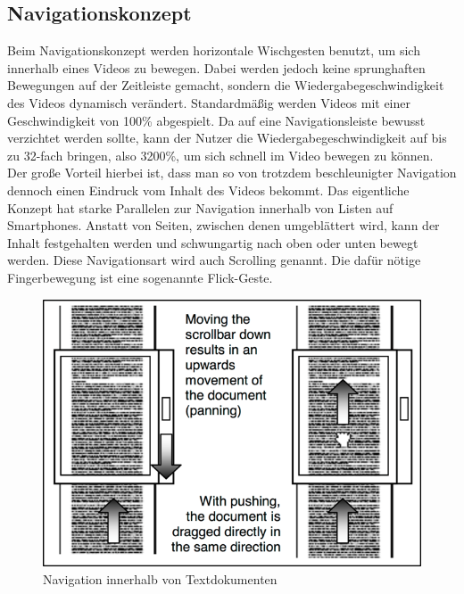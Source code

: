 \documentclass[11pt,a4paper]{report}
\begin{document}
\subsection{Navigationskonzept}

Beim Navigationskonzept werden horizontale Wischgesten benutzt, um sich innerhalb eines Videos zu bewegen. Dabei werden jedoch keine sprunghaften Bewegungen auf der Zeitleiste gemacht, sondern die Wiedergabegeschwindigkeit des Videos dynamisch verändert. Standardmäßig werden Videos mit einer Geschwindigkeit von 100\% abgespielt. Da auf eine Navigationsleiste bewusst verzichtet werden sollte, kann der Nutzer die Wiedergabegeschwindigkeit auf bis zu 32-fach bringen, also 3200\%, um sich schnell im Video bewegen zu können. Der große Vorteil hierbei ist, dass man so von trotzdem beschleunigter Navigation dennoch einen Eindruck vom Inhalt des Videos bekommt. Das eigentliche Konzept hat starke Parallelen zur Navigation innerhalb von Listen auf Smartphones. Anstatt von Seiten, zwischen denen umgeblättert wird, kann der Inhalt festgehalten werden und schwungartig nach oben oder unten bewegt werden. Diese Navigationsart wird auch Scrolling genannt. Die dafür nötige Fingerbewegung ist eine sogenannte Flick-Geste.
\begin{figure}[h]
\begin{center}
\includegraphics[scale=1.2]{./images/16.png}
\caption{Navigation innerhalb von Textdokumenten \cite{hurst2008interfaces}}
\label{scrolling_text}
\end{center}
\end{figure}
\end{document}

